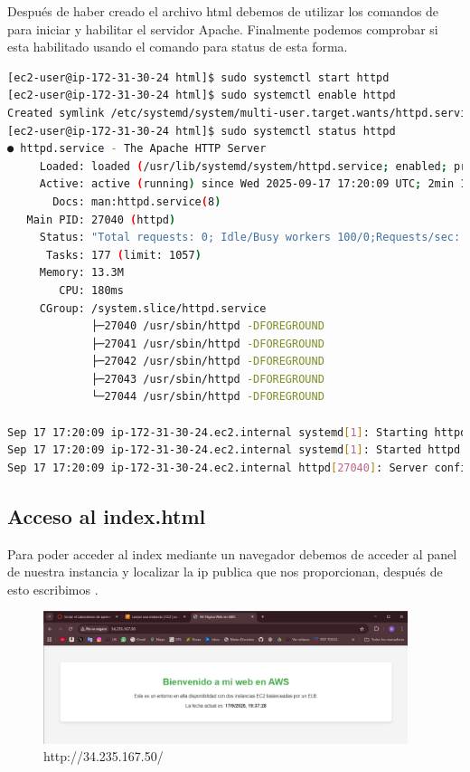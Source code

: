 \documentclass{article}
\begin{document}
	Después de haber creado el archivo html debemos de utilizar los comandos de  para iniciar y habilitar el servidor Apache. Finalmente podemos comprobar si esta habilitado usando el comando para status de esta forma. 

\begin{lstlisting}[style=consola, language=bash, caption={Terminal, systemctl}]
[ec2-user@ip-172-31-30-24 html]$ sudo systemctl start httpd
[ec2-user@ip-172-31-30-24 html]$ sudo systemctl enable httpd
Created symlink /etc/systemd/system/multi-user.target.wants/httpd.service → /usr/lib/systemd/system/httpd.service.
[ec2-user@ip-172-31-30-24 html]$ sudo systemctl status httpd
● httpd.service - The Apache HTTP Server
     Loaded: loaded (/usr/lib/systemd/system/httpd.service; enabled; preset: disabled)
     Active: active (running) since Wed 2025-09-17 17:20:09 UTC; 2min 11s ago
       Docs: man:httpd.service(8)
   Main PID: 27040 (httpd)
     Status: "Total requests: 0; Idle/Busy workers 100/0;Requests/sec: 0; Bytes served/sec:   0 B/sec"
      Tasks: 177 (limit: 1057)
     Memory: 13.3M
        CPU: 180ms
     CGroup: /system.slice/httpd.service
             ├─27040 /usr/sbin/httpd -DFOREGROUND
             ├─27041 /usr/sbin/httpd -DFOREGROUND
             ├─27042 /usr/sbin/httpd -DFOREGROUND
             ├─27043 /usr/sbin/httpd -DFOREGROUND
             └─27044 /usr/sbin/httpd -DFOREGROUND

Sep 17 17:20:09 ip-172-31-30-24.ec2.internal systemd[1]: Starting httpd.service - The Apache HTTP Server...
Sep 17 17:20:09 ip-172-31-30-24.ec2.internal systemd[1]: Started httpd.service - The Apache HTTP Server.
Sep 17 17:20:09 ip-172-31-30-24.ec2.internal httpd[27040]: Server configured, listening on: port 80
\end{lstlisting}

\subsection{Acceso al index.html}

	Para poder acceder al index mediante un navegador debemos de acceder al panel de nuestra instancia y localizar la ip publica que nos proporcionan, después de esto escribimos .

	\begin{figure}[H]
	\centering
	\includegraphics[width=0.95\textwidth]{index.png}
	\caption{http://34.235.167.50/}
	\end{figure}
\end{document}
